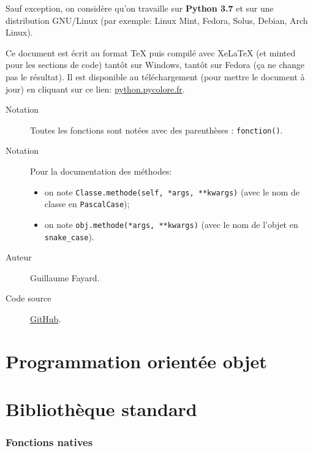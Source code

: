 \documentclass[a4paper, 10pt]{article}
\begin{document}
Sauf exception, on considère qu'on travaille sur \textbf{Python 3.7} et sur une distribution GNU/Linux (par exemple: Linux Mint, Fedora, Solus, Debian, Arch Linux).\bigskip

Ce document est écrit au format TeX puis compilé avec XeLaTeX (et minted pour les sections de code) tantôt sur Windows, tantôt sur Fedora (ça ne change pas le résultat). Il est disponible au téléchargement (pour mettre le document à jour) en cliquant sur ce lien: \href{https://python.pycolore.fr}{python.pycolore.fr}.\bigskip

\begin{description}
	\item[{\sffamily Notation}] Toutes les fonctions sont notées avec des parenthèses : \texttt{fonction()}.	\item[{\sffamily Notation}] Pour la documentation des méthodes:
		\begin{itemize}
			\item on note \texttt{Classe.methode(self, *args, **kwargs)} (avec le nom de classe en \texttt{PascalCase});
			\item on note \texttt{obj.methode(*args, **kwargs)} (avec le nom de l'objet en \texttt{snake_case}).
		\end{itemize} 
	\item[{\sffamily Auteur}] Guillaume Fayard.
	\item[{\sffamily Code source}] \href{https://github.com/Arkelis/memo-python}{GitHub}.
\end{description}

\newpage
\part{Programmation orientée objet}











\newpage

\part{Bibliothèque standard}
\section{Fonctions natives}
\end{document}
